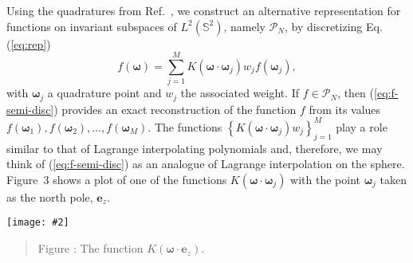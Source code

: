 \documentclass[landscape,a0b,final]{a0poster}
\newcommand{\HH}{{\mathcal P}}
\newcommand{\bomega}{{\boldsymbol{\omega}}}
\newenvironment{poster}{
  \begin{center}
  \begin{minipage}[c]{0.98\textwidth}
}{
  \end{minipage} 
  \end{center}
}
\newcommand{\myfig}[3][0]{
\begin{center}
  \vspace{1.25cm}
  \texttt{[image: \#2]}
  \nobreak\medskip
\end{center}}
\newcommand{\mycaption}[1]{
  \vspace{0.25cm}
  \begin{quote}
    {{\sc Figure} \arabic{figure}: #1}
  \end{quote}
  \vspace{0.25cm}
  \stepcounter{figure}
}
\begin{document}
\begin{poster}
\begin{multicols}{3}
Using the quadratures from Ref.~\cite{AHR-BEY-2009}, we construct an alternative representation for functions on invariant
subspaces of $L^{2}\left(\mathbb{S}^{2}\right)$, namely $\HH_{N}$, by discretizing Eq. (\ref{eq:rep})
%
\begin{equation}
  f\left(\boldsymbol{\omega}\right)=\sum_{j=1}^{M}K\left(\bomega\cdot\bomega_{j}\right)w_{j}f\left(\bomega_{j}\right),
  \label{eq:f-semi-disc}
\end{equation}
%
with $\bomega_{j}$ a quadrature point and $w_{j}$ the associated weight. If $f\in\HH_{N}$, then (\ref{eq:f-semi-disc}) provides
an exact reconstruction of the function $f$ from its values $f\left(\bomega_{1}\right),f\left(\bomega_{2}\right),\dots,f\left(\bomega_{M}\right)$.
The functions $\left\{ K\left(\bomega\cdot\bomega_{j}\right)w_{j}\right\} _{j=1}^{M}$
play a role similar to that of Lagrange interpolating polynomials
and, therefore, we may think of (\ref{eq:f-semi-disc}) as an analogue
of Lagrange interpolation on the sphere. Figure~3 shows a plot of one of the functions $K\left(\bomega\cdot\bomega_{j}\right)$ with the point $\bomega_{j}$ taken as the north pole, $\mathbf{e}_z$.
\begin{center}
  \myfig[0]{splot.eps}{0.3}
  \mycaption{The function $K\left(\bomega\cdot\mathbf{e}_z\right)$.}
\end{center}



\end{multicols}
\end{poster}
\end{document}
